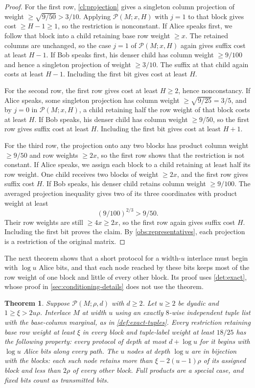 \documentclass[11pt,letterpaper]{article} \usepackage[utf8]{inputenc}
\theoremstyle{plain} \newtheorem{theorem}{Theorem}[section]
\theoremstyle{definition} \newaliascnt{definition}{theorem}
\newcommand{\RP}[3]{\mathcal{P}(#1;#2,#3)}
\begin{document}
\begin{proof}
For the first row, \cref{cl:projection} gives a singleton column projection
of weight $\ge\sqrt{9/50}>3/10$. Applying $\RP{M}{x}{H}$ with $j=1$ to
that block gives cost $\ge H-1\ge1$,
so the restriction is nonconstant. If Alice speaks first, we follow that block
into a child retaining base row weight $\ge x$. The retained columns are
unchanged, so the case $j=1$ of $\RP{M}{x}{H}$ again gives suffix cost at least $H-1$.
If Bob speaks first, his denser child has column weight $\ge9/100$
and hence a singleton projection of weight $\ge3/10$. The suffix at that
child again costs at least $H-1$. Including the first bit gives cost at least $H$.

For the second row, the first row gives cost at least $H\ge2$, hence nonconstancy. If Alice
speaks, some singleton projection has column weight $\ge\sqrt{9/25}=3/5$, and by $j=0$
in $\RP{M}{x}{H}$, a child retaining half the row weight of that block costs at least $H$. If Bob speaks, his denser
child has column weight $\ge9/50$, so the first row gives suffix
cost at least $H$. Including the first bit gives cost at least $H+1$.

For the third row, the projection onto any two blocks has product column weight
$\ge9/50$ and row weights $\ge2x$, so the first row shows that the restriction is not constant. If Alice speaks, we assign each block to a child
retaining at least half its row weight. One child receives two blocks of weight $\ge2x$,
and the first row gives suffix cost $H$. If Bob speaks, his denser child
retains column weight $\ge9/100$. The averaged projection inequality gives
two of its three coordinates with product weight at least
\[
(9/100)^{2/3}>9/50.
\]
Their row weights are still $\ge4x\ge2x$, so the first row again gives
suffix cost $H$. Including the first bit proves the claim. By
\cref{obs:representatives}, each projection is a restriction of the original matrix.
\end{proof}

The next theorem shows that a short protocol for a width-$u$ interlace must
begin with $\log u$ Alice bits, and that each node reached by these bits keeps most of
the row weight of one block and little of every other block. Its proof uses \cref{det:exact}, whose proof in
\cref{sec:conditioning-details} does not use the theorem.

\begin{theorem}\label{cl:separation}
Suppose $\RP{M}{\rho}{d}$ with $d\ge2$. Let $u\ge2$ be dyadic and
$1\ge\xi>2u\rho$. Interlace $M$ at width $u$ using an exactly $8$-wise independent
tuple list with the base-column marginal, as in \cref{def:exact-tuples}.
Every restriction retaining base row weight at least $\xi$ in every block
and tuple-label weight at least $18/25$ has the following property: every
protocol of depth at most $d+\log u$ for it begins with $\log u$ Alice bits
along every path.
The $u$ nodes at depth $\log u$ are in bijection with the blocks: each such
node retains more
than $\xi-2(u-1)\rho$ of its assigned block and less than $2\rho$ of every
other block. Full products are a special case, and fixed bits count as transmitted bits.
\end{theorem}
\end{document}
